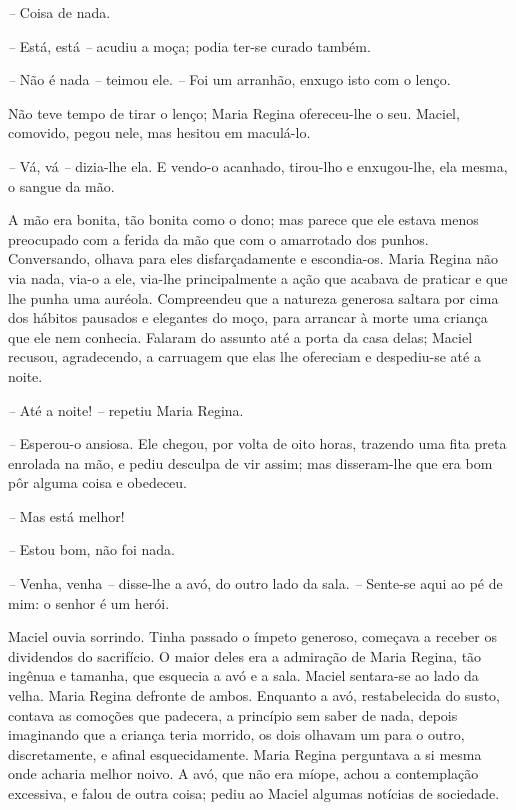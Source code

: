 \emph{--} Coisa de nada.

\emph{--} Está, está \emph{--} acudiu a moça; podia ter-se curado
também.

\emph{--} Não é nada \emph{--} teimou ele. \emph{--} Foi um arranhão,
enxugo isto com o lenço.

Não teve tempo de tirar o lenço; Maria Regina ofereceu-lhe o seu.
Maciel, comovido, pegou nele, mas hesitou em maculá-lo.

\emph{--} Vá, vá \emph{--} dizia-lhe ela. E vendo-o acanhado, tirou-lho
e enxugou-lhe, ela mesma, o sangue da mão.

A mão era bonita, tão bonita como o dono; mas parece que ele estava
menos preocupado com a ferida da mão que com o amarrotado dos punhos.
Conversando, olhava para eles disfarçadamente e escondia-os. Maria
Regina não via nada, via-o a ele, via-lhe principalmente a ação que
acabava de praticar e que lhe punha uma auréola. Compreendeu que a
natureza generosa saltara por cima dos hábitos pausados e elegantes do
moço, para arrancar à morte uma criança que ele nem conhecia. Falaram do
assunto até a porta da casa delas; Maciel recusou, agradecendo, a
carruagem que elas lhe ofereciam e despediu-se até a noite.

\emph{--} Até a noite! \emph{--} repetiu Maria Regina.

\emph{--} Esperou-o ansiosa. Ele chegou, por volta de oito horas,
trazendo uma fita preta enrolada na mão, e pediu desculpa de vir assim;
mas disseram-lhe que era bom pôr alguma coisa e obedeceu.

\emph{--} Mas está melhor!

\emph{--} Estou bom, não foi nada.

\emph{--} Venha, venha \emph{--} disse-lhe a avó, do outro lado da sala.
\emph{--} Sente-se aqui ao pé de mim: o senhor é um herói.

Maciel ouvia sorrindo. Tinha passado o ímpeto generoso, começava a
receber os dividendos do sacrifício. O maior deles era a admiração de
Maria Regina, tão ingênua e tamanha, que esquecia a avó e a sala. Maciel
sentara-se ao lado da velha. Maria Regina defronte de ambos. Enquanto a
avó, restabelecida do susto, contava as comoções que padecera, a
princípio sem saber de nada, depois imaginando que a criança teria
morrido, os dois olhavam um para o outro, discretamente, e afinal
esquecidamente. Maria Regina perguntava a si mesma onde acharia melhor
noivo. A avó, que não era míope, achou a contemplação excessiva, e falou
de outra coisa; pediu ao Maciel algumas notícias de sociedade.

